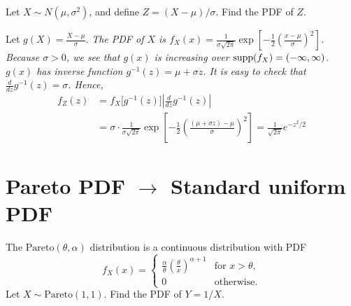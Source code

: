 \begin{example}
Let $X\sim N(\mu,\sigma^2)$, and define $Z=(X-\mu)/\sigma$. Find the PDF of $Z$.
\end{example}
\begin{solution}
Let $g(X) = \displaystyle \frac{X-\mu}{\sigma}$. 
\bit
\it The PDF of $X$ is $f_X(x) = \displaystyle\frac{1}{\sigma\sqrt{2\pi}}\exp\left[-\frac{1}{2}\left(\frac{x-\mu}{\sigma}\right)^2\right]$.
\it Because $\sigma>0$, we see that $g(x)$ is increasing over $\text{supp}(f_X) = (-\infty,\infty)$.
\it $g(x)$ has inverse function $g^{-1}(z) = \mu + \sigma z$.
\it It is easy to check that $\displaystyle\frac{d}{dz}g^{-1}(z) = \sigma$.
\eit
Hence,
\begin{align*}
f_Z(z)
	& = f_X\big[g^{-1}(z)\big]\left|\frac{d}{dz}g^{-1}(z)\right| \\
	& = \sigma\cdot\frac{1}{\sigma\sqrt{2\pi}}\exp\left[-\frac{1}{2}\left(\frac{(\mu+\sigma z)-\mu}{\sigma}\right)^2\right]
	  = \frac{1}{\sqrt{2\pi}}e^{-z^2/2}
\end{align*}
\end{solution}

\section{Pareto PDF $\longrightarrow$ Standard uniform PDF}


\begin{example}
The $\text{Pareto}(\theta,\alpha)$ distribution is a continuous distribution with PDF
\[
f_X(x) = \begin{cases}
	\displaystyle\frac{\alpha}{\theta}\left(\frac{\theta}{x}\right)^{\alpha+1}		& \text{for } x > \theta, \\[2ex]
	0																			& \text{otherwise.}
\end{cases}
\]
Let $X\sim\text{Pareto}(1,1)$. Find the PDF of $Y=1/X$.%
\end{example}

